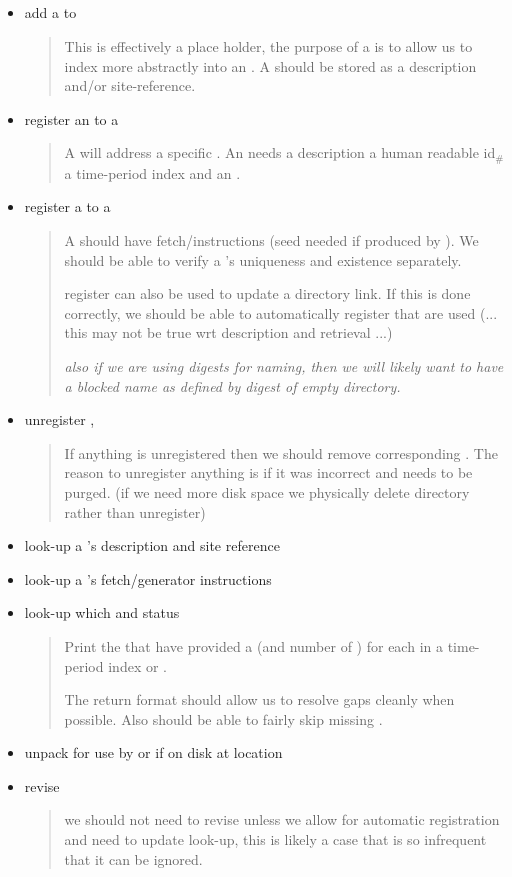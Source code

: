 \documentclass[8pt,letterpaper]{article} %
\newenvironment{slimlist}{
  \begin{itemize}
    \setlength{\topsep}{0pt}
    \setlength{\itemsep}{1pt}
    \setlength{\parsep}{0pt}
    \setlength{\parskip}{0pt}
}{\end{itemize}}
\newenvironment{mitemize}[1]{
  \subsection*{#1}
  \begin{slimlist}
}{
\end{slimlist}
\vspace{1em}
\pagebreak
}
\begin{document}
\begin{mitemize}{\cp}
\item add a \cp to \ptk
  \begin{quote}
    This is effectively a place holder, the purpose of a \cp is to allow us to index more abstractly into an \ins. A \cp should be stored as a description and/or site-reference. 
    \end{quote}
\item register an \ins to a \cp
  \begin{quote}
    A \sol will address a specific \ins. An \ins needs a description a human readable id$_\#$ a time-period index and an \tev. 
    
  \end{quote}
\item register a \ds to a \ins
  \begin{quote}
    A \ds should have fetch/\gen instructions (seed needed if produced by \gen). We should be able to verify a \ds's uniqueness and existence separately.
    
    register can also be used to update a  directory link. If this is done correctly, we should be able to automatically register  that are used (... this may not be true wrt description and retrieval ...)

    {\em\footnotesize also if we are using digests for naming, then we will likely want to have a blocked name as defined by digest of empty directory.}
  \end{quote}
\item unregister \ds, \ins
  \begin{quote}
    If anything is unregistered then we should remove corresponding . The reason to unregister anything is if it was incorrect and needs to be purged. (if we need more disk space we physically delete directory rather than unregister)
  \end{quote}
  
\item look-up a \cp's description and site reference
\item look-up a \ds's fetch/generator instructions
\item look-up which \ins and \ds status 
  \begin{quote}
    Print the  that have provided a \sol (and number of ) for each \ds in a time-period index or \ins .
    
    The return format should allow us to resolve gaps cleanly when possible. Also should be able to fairly skip missing .
  \end{quote}
\item unpack \ds for use by \tev or \sol if on disk at location

\item revise \ds
\begin{quote}
  we should not need to revise unless we allow for automatic registration and need to update look-up, this is likely a case that is so infrequent that it can be ignored. 
\end{quote}
\end{mitemize}
\end{document}
